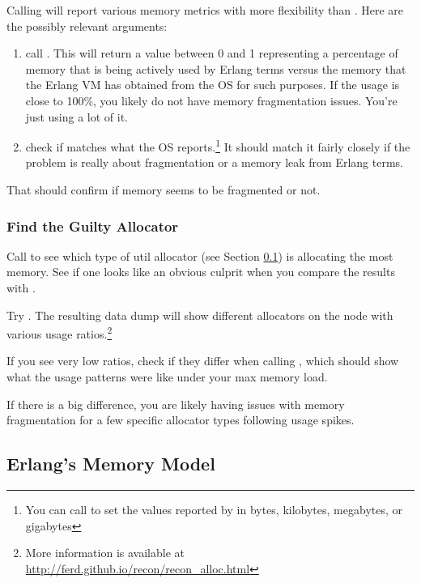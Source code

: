 \documentclass[11pt, oneside]{book}   	%
\begin{document}
Calling  will report various memory metrics with more flexibility than . Here are the possibly relevant arguments:

\begin{enumerate}
	\item call . This will return a value between 0 and 1 representing a percentage of memory that is being actively used by Erlang terms versus the memory that the Erlang VM has obtained from the OS for such purposes. If the usage is close to 100\%, you likely do not have memory fragmentation issues. You're just using a lot of it.
	\item check if  matches what the OS reports.\footnote{You can call  to set the values reported by  in bytes, kilobytes, megabytes, or gigabytes} It should match it fairly closely if the problem is really about fragmentation or a memory leak from Erlang terms.
\end{enumerate}

That should confirm if memory seems to be fragmented or not.

\subsubsection{Find the Guilty Allocator}

Call  to see which type of util allocator (see Section \ref{subsec:erlang-memory-model}) is allocating the most memory. See if one looks like an obvious culprit when you compare the results with .

Try . The resulting data dump will show different allocators on the node with various usage ratios.\footnote{More information is available at \href{http://ferd.github.io/recon/recon\_alloc.html}{http://ferd.github.io/recon/recon\_alloc.html}}

If you see very low ratios, check if they differ when calling , which should show what the usage patterns were like under your max memory load.

If there is a big difference, you are likely having issues with memory fragmentation for a few specific allocator types following usage spikes.

\subsection{Erlang's Memory Model}
\label{subsec:erlang-memory-model}
\end{document}
